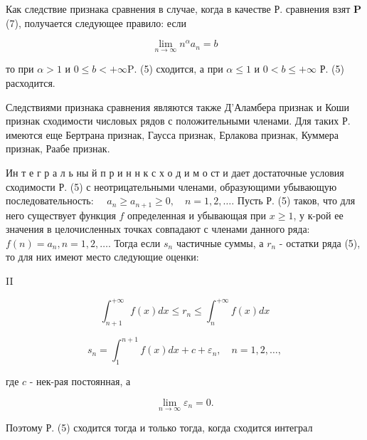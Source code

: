 \documentclass[10pt]{article}
\begin{document}
Как следствие признака сравнения в случае, когда в качестве Р. сравнения взят $\mathbf{P}$ (7), получается следующее правило: если



\[

\lim _{n \rightarrow \infty} n^{\alpha} a_{n}=b

\]



то при $\alpha>1$ и $0 \leqslant b<+\infty \mathrm{P}$. (5) сходится, а при $\alpha \leqslant 1$ и $0<b \leqslant+\infty$ Р. (5) расходится.



Следствиями признака сравнения являются также Д'Аламбера признак и Коши признак сходимости числовых рядов с положительными членами. Для таких Р. имеются еще Бертрана признак, Гаусса признак, Ерлакова признак, Куммера признак, Раабе признак.



Ин т е г р а л ь ны й п р и $\mathbf{н}$ н к с х о д и м о ст и дает достаточные условия сходимости Р. (5) с неотрицательными членами, образующими убывающую последовательность: $\quad a_{n} \geqslant a_{n+1} \geqslant 0, \quad n=1,2, \ldots$. Пусть Р. (5) таков, что для него существует функция $f$ определенная и убывающая при $x \geqslant 1$, у к-рой ее значения в целочисленных точках совпадают с членами данного ряда: $f(n)=a_{n}, n=1,2, \ldots$. Тогда если $s_{n}$ частичные суммы, а $r_{n}$ - остатки ряда (5), то для них имеют место следующие оценки:



II



\[

\int_{n+1}^{+\infty} f(x) d x \leqslant r_{n} \leqslant \int_{n}^{+\infty} f(x) d x

\]



\[

s_{n}=\int_{1}^{n+1} f(x) d x+c+\varepsilon_{n}, \quad n=1,2, \ldots,

\]



где $c$ - нек-рая постоянная, а



\[

\lim _{n \rightarrow \infty} \varepsilon_{n}=0 .

\]



Поэтому Р. (5) сходится тогда и только тогда, когда сходится интеграл
\end{document}
